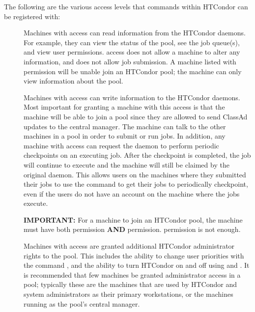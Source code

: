 The following are the various access levels that commands within
HTCondor can be registered with:

\begin{description}

\item[] \label{dcperm:read} Machines with 
   access can read information from the HTCondor daemons.  For example, they can
   view the status of the pool, see the job queue(s), and view user
   permissions.   access does not allow a machine to
   alter any information, and does not allow
   job submission. A machine listed
   with  permission will be unable join an HTCondor pool; the machine can
   only view information about the pool.

\item[] \label{dcperm:write} Machines with
    access can write information to the HTCondor daemons.
   Most important for granting a machine with this access is that the machine
   will be able to join a pool since they are allowed to send ClassAd
   updates to the central manager.
   The machine can talk to the other machines
   in a pool in order to submit or run jobs.
   In addition, any machine with
    access can request the  daemon to perform
   periodic checkpoints on an executing job. After the
   checkpoint is completed, the job will continue to execute and the
   machine will still be claimed by the original  daemon.
   This allows users on the machines where they submitted their jobs
   to use the  command to get their jobs to
   periodically checkpoint, even if the users do not have an account on the
   machine where the jobs execute.

   \textbf{IMPORTANT:} For a machine to join an HTCondor pool, the machine must
   have both  permission \textbf{AND}  permission.
    permission is not enough.

\item[] \label{dcperm:administrator} Machines
   with  access are granted additional HTCondor
   administrator rights to the pool.  This includes the ability to
   change user priorities with the command ,
   and the ability to turn HTCondor on and off
   using  and  .
   It is recommended that few machines be granted administrator access in a pool;
   typically these are the machines that are used by HTCondor and system
   administrators as their primary workstations,
   or the machines running as the pool's central manager.


\end{description}
